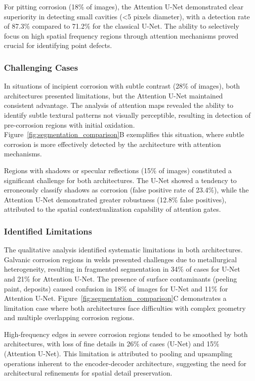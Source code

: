 \documentclass[12pt,a4paper,twoside]{article}
\begin{document}
For pitting corrosion (18\% of images), the Attention U-Net demonstrated clear superiority in detecting small cavities (<5 pixels diameter), with a detection rate of 87.3\% compared to 71.2\% for the classical U-Net. The ability to selectively focus on high spatial frequency regions through attention mechanisms proved crucial for identifying point defects.

\subsubsection{Challenging Cases}

In situations of incipient corrosion with subtle contrast (28\% of images), both architectures presented limitations, but the Attention U-Net maintained consistent advantage. The analysis of attention maps revealed the ability to identify subtle textural patterns not visually perceptible, resulting in detection of pre-corrosion regions with initial oxidation. Figure~\ref{fig:segmentation_comparison}B exemplifies this situation, where subtle corrosion is more effectively detected by the architecture with attention mechanisms.

Regions with shadows or specular reflections (15\% of images) constituted a significant challenge for both architectures. The U-Net showed a tendency to erroneously classify shadows as corrosion (false positive rate of 23.4\%), while the Attention U-Net demonstrated greater robustness (12.8\% false positives), attributed to the spatial contextualization capability of attention gates.

\subsubsection{Identified Limitations}

The qualitative analysis identified systematic limitations in both architectures. Galvanic corrosion regions in welds presented challenges due to metallurgical heterogeneity, resulting in fragmented segmentation in 34\% of cases for U-Net and 21\% for Attention U-Net. The presence of surface contaminants (peeling paint, deposits) caused confusion in 18\% of images for U-Net and 11\% for Attention U-Net. Figure~\ref{fig:segmentation_comparison}C demonstrates a limitation case where both architectures face difficulties with complex geometry and multiple overlapping corrosion regions.

High-frequency edges in severe corrosion regions tended to be smoothed by both architectures, with loss of fine details in 26\% of cases (U-Net) and 15\% (Attention U-Net). This limitation is attributed to pooling and upsampling operations inherent to the encoder-decoder architecture, suggesting the need for architectural refinements for spatial detail preservation.
\end{document}
